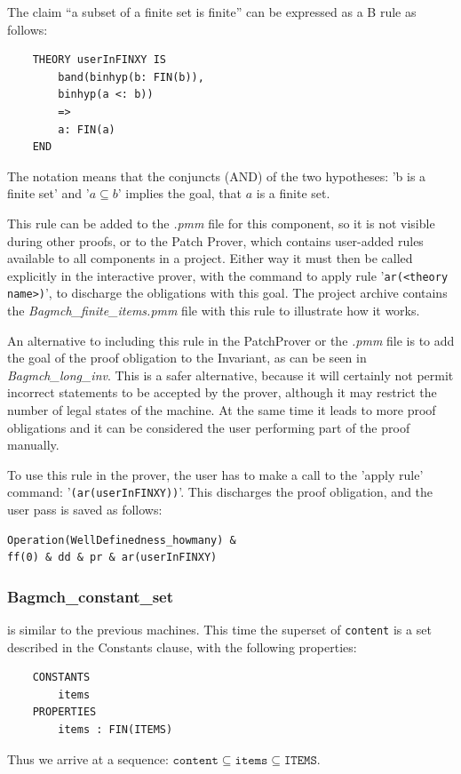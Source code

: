 \documentclass[12pt,journal,duplex]{IEEEtran}
\begin{document}
	The claim ``a subset of a finite set is finite'' can be expressed as a B rule as follows:

	\begin{lstlisting}
	THEORY userInFINXY IS
		band(binhyp(b: FIN(b)),
		binhyp(a <: b))
		=>
		a: FIN(a)
	END
	\end{lstlisting}

	The notation means that the conjuncts (AND) of the two hypotheses: 'b is a finite set' and '$a \subseteq b$' implies the goal, that $a$ is a finite set.

	This rule can be added to the \emph{.pmm} file for this component, so it is not visible during other proofs, or to the Patch Prover, which contains user-added rules available to all components in a project. Either way it must then be called explicitly in the interactive prover, with the command to apply rule '\texttt{ar(<theory name>)}', to discharge the obligations with this goal. The project archive contains the \emph{Bagmch\_finite\_items.pmm} file with this rule to illustrate how it works.

	An alternative to including this rule in the PatchProver or the \emph{.pmm} file is to add the goal of the proof obligation to the Invariant, as can be seen in \emph{Bagmch\_long\_inv}. This is a safer alternative, because it will certainly not permit incorrect statements to be accepted by the prover, although it may restrict the number of legal states of the machine. At the same time it leads to more proof obligations and it can be considered the user performing part of the proof manually.

	To use this rule in the prover, the user has to make a call to the 'apply rule' command: '\texttt{(ar(userInFINXY))}'. This discharges the proof obligation, and the user pass is saved as follows:
\begin{lstlisting}
Operation(WellDefinedness_howmany) &
ff(0) & dd & pr & ar(userInFINXY)
	\end{lstlisting}

	\subsubsection{Bagmch\_constant\_set} is similar to the previous machines. This time the superset of \texttt{content} is a set described in the Constants clause, with the following properties:

	\begin{lstlisting}
	CONSTANTS
		items
	PROPERTIES
		items : FIN(ITEMS)
	\end{lstlisting}
	Thus we arrive at a sequence: $\texttt{content} \subseteq \texttt{items} \subseteq \texttt{ITEMS}$.
\end{document}
